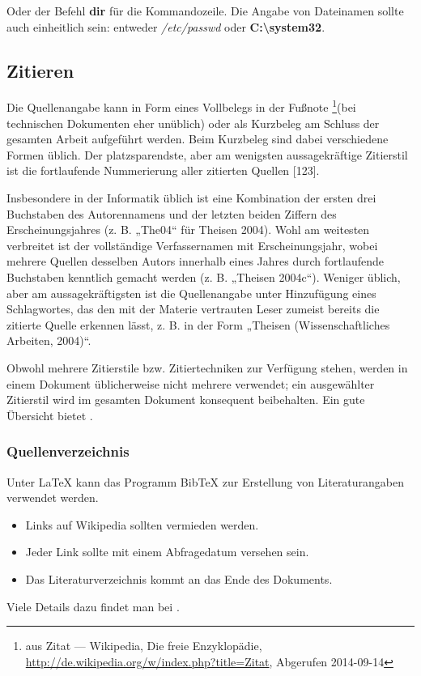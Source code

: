 \documentclass[a4paper,ngerman,naustrian,DIV=12,BCOR=1cm]{scrbook}
\newcommand{\strong}[1]{\textbf{#1}}
\begin{document}
Oder der Befehl \strong{dir} für die Kommandozeile. Die Angabe von
Dateinamen sollte auch einheitlich sein: entweder \emph{/etc/passwd}
oder \strong{C:\textbackslash{}system32}.


\subsection{Zitieren}

Die Quellenangabe kann in Form eines Vollbelegs in der Fußnote%
\footnote{aus Zitat --- Wikipedia, Die freie Enzyklopädie, \url{http://de.wikipedia.org/w/index.php?title=Zitat},
Abgerufen 2014-09-14%
}(bei technischen Dokumenten eher unüblich) oder als Kurzbeleg am Schluss
der gesamten Arbeit aufgeführt werden. Beim Kurzbeleg sind dabei verschiedene
Formen üblich. Der platzsparendste, aber am wenigsten aussagekräftige
Zitierstil ist die fortlaufende Nummerierung aller zitierten Quellen
{[}123{]}.

Insbesondere in der Informatik üblich ist eine Kombination der ersten
drei Buchstaben des Autorennamens und der letzten beiden Ziffern des
Erscheinungsjahres (z. B. „The04“ für Theisen 2004). Wohl am weitesten
verbreitet ist der vollständige Verfassernamen mit Erscheinungsjahr,
wobei mehrere Quellen desselben Autors innerhalb eines Jahres durch
fortlaufende Buchstaben kenntlich gemacht werden (z. B. „Theisen 2004c“).
Weniger üblich, aber am aussagekräftigsten ist die Quellenangabe unter
Hinzufügung eines Schlagwortes, das den mit der Materie vertrauten
Leser zumeist bereits die zitierte Quelle erkennen lässt, z. B. in
der Form „Theisen (Wissenschaftliches Arbeiten, 2004)“.

Obwohl mehrere Zitierstile bzw. Zitiertechniken zur Verfügung stehen,
werden in einem Dokument üblicherweise nicht mehrere verwendet; ein
ausgewählter Zitierstil wird im gesamten Dokument konsequent beibehalten.
Ein gute Übersicht bietet \cite{wiki:zitat}.


\subsubsection{Quellenverzeichnis}

Unter \LaTeX{} kann das Programm Bib\TeX{} zur Erstellung von Literaturangaben
verwendet werden. 
\begin{itemize}
\item Links auf Wikipedia sollten vermieden werden.
\item Jeder Link sollte mit einem Abfragedatum versehen sein.
\item Das Literaturverzeichnis kommt an das Ende des Dokuments.
\end{itemize}
Viele Details dazu findet man bei \cite{wiki:zitat}.
\end{document}
